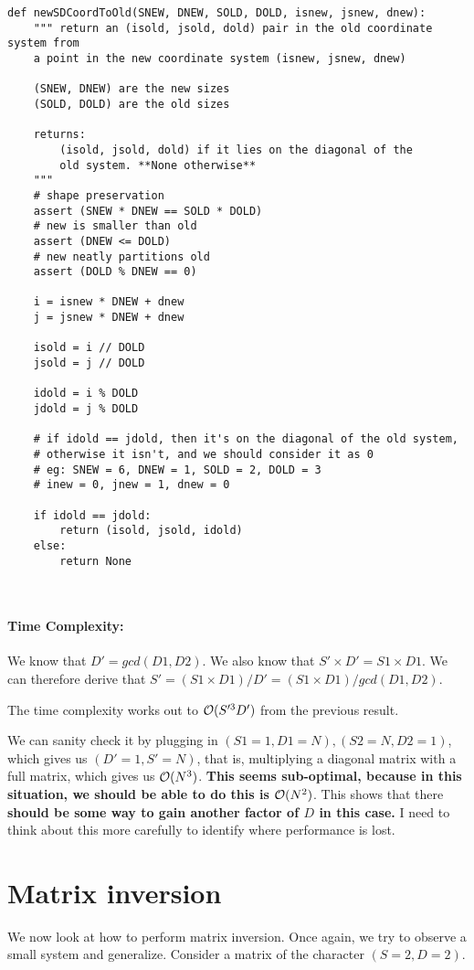 \documentclass[11pt]{article}
\begin{document}
\begin{verbatim}
def newSDCoordToOld(SNEW, DNEW, SOLD, DOLD, isnew, jsnew, dnew):
    """ return an (isold, jsold, dold) pair in the old coordinate system from
    a point in the new coordinate system (isnew, jsnew, dnew)

    (SNEW, DNEW) are the new sizes
    (SOLD, DOLD) are the old sizes

    returns:
        (isold, jsold, dold) if it lies on the diagonal of the
        old system. **None otherwise**
    """
    # shape preservation
    assert (SNEW * DNEW == SOLD * DOLD)
    # new is smaller than old
    assert (DNEW <= DOLD)
    # new neatly partitions old
    assert (DOLD % DNEW == 0)

    i = isnew * DNEW + dnew
    j = jsnew * DNEW + dnew

    isold = i // DOLD
    jsold = j // DOLD

    idold = i % DOLD
    jdold = j % DOLD

    # if idold == jdold, then it's on the diagonal of the old system,
    # otherwise it isn't, and we should consider it as 0
    # eg: SNEW = 6, DNEW = 1, SOLD = 2, DOLD = 3
    # inew = 0, jnew = 1, dnew = 0

    if idold == jdold:
        return (isold, jsold, idold)
    else:
        return None



\end{verbatim}
\paragraph{\textbf{Time Complexity:}}
We know that $D' = gcd(D1, D2)$. We also know that $S' \times D' = S1 \times D1$.
We can therefore derive that $S' = (S1 \times D1) / D' = (S1 \times D1) / gcd(D1, D2)$.

The time complexity works out to $\mathcal{O}(S'^3 D')$ from the previous result.

We can sanity check it by plugging in $(S1 = 1, D1 = N), (S2 = N, D2 = 1)$, which gives us
$(D' = 1, S' = N)$, that is, multiplying a diagonal matrix with a full matrix,
which gives us  $\mathcal{O}(N^3)$.
\textbf{This seems sub-optimal, because in this situation, we should be able to do
this is $\mathcal{O}(N^2)$}. This shows that there \textbf{should be some way to gain another
factor of $D$ in this case.} I need to think about this more carefully
to identify where performance is lost.


\section{Matrix inversion}
We now look at how to perform matrix inversion. Once again, we try to observe
a small system and generalize. Consider a matrix of the character $(S = 2, D = 2)$.
\end{document}

